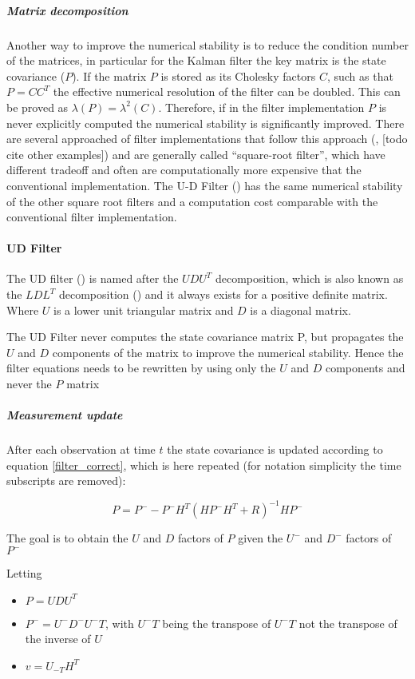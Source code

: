 \documentclass{article}
\begin{document}
\subparagraph{Matrix decomposition} Another way to improve the numerical stability is to reduce the condition number of the matrices, in particular for the Kalman filter the key matrix is the state covariance ($P$). If the matrix $P$ is stored as its Cholesky factors $C$, such as that $P = CC^T$ the effective numerical resolution of the filter can be doubled. This can be proved as $\lambda(P) = \lambda^2(C)$. Therefore, if in the filter implementation $P$ is never explicitly computed the numerical stability is significantly improved.
There are several approached of filter implementations that follow this approach (\cite{potter_statistical_1963}, [todo cite other examples]) and are generally called ``square-root filter'', which have different tradeoff and often are computationally more expensive that the conventional implementation. The U-D Filter (\cite{bierman_numerical_1977}) has the same numerical stability of the other square root filters and a computation cost comparable with the conventional filter implementation.

\paragraph{UD Filter}

The UD filter (\cite{bierman_numerical_1977}) is named after the $UDU^T$ decomposition, which is also known as the $LDL^T$ decomposition (\cite{golub_matrix_2013}) and it always exists for a positive definite matrix. Where $U$ is a lower unit triangular matrix and $D$ is a diagonal matrix.

The UD Filter never computes the state covariance matrix P, but propagates the $U$ and $D$ components of the matrix to improve the numerical stability. Hence the filter equations needs to be rewritten by using only the $U$ and $D$ components and never the $P$ matrix

\subparagraph{Measurement update}

After each observation at time $t$ the state covariance is updated according to equation \ref{filter_correct}, which is here repeated (for notation simplicity the time subscripts are removed):

$$ P = P^- - P^-H^T(HP^-H^T + R)^{-1}HP^-$$

The goal is to obtain the $U$ and $D$ factors of $P$ given the $U^-$ and $D^-$ factors of $P^-$

Letting
\begin{itemize}
    \item $P = UDU^T$
    \item $P^- = U^-D^-U^-T$, with $U^-T$ being the transpose of $U^-T$ not the transpose of the inverse of $U$
    \item $v = U_{-T}H^T$
\end{itemize}
\end{document}
